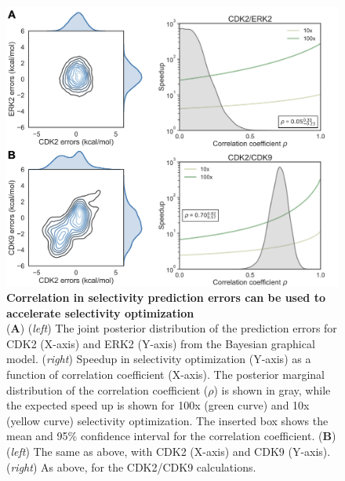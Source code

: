 \documentclass[phd,tocprelim]{cornell}
\begin{document}
\begin{landscape}
\begin{figure}
\centering
\includegraphics[width=0.7\linewidth]{figures/figure5.png}
\caption[Correlation in selectivity prediction errors can be used to accelerate selectivity optimization]{
{\bf Correlation in selectivity prediction errors can be used to accelerate selectivity optimization} \\
({\bf A}) (\emph{left}) The joint posterior distribution of the prediction errors for CDK2 (X-axis) and ERK2 (Y-axis) from the Bayesian graphical model. (\emph{right}) Speedup in selectivity optimization (Y-axis) as a function of correlation coefficient (X-axis). The posterior marginal distribution of the correlation coefficient ($\rho$) is shown in gray, while the expected speed up is shown for 100x (green curve) and 10x (yellow curve) selectivity optimization. The inserted box shows the mean and 95\% confidence interval for the correlation coefficient. 
({\bf B}) (\emph{left}) The same as above, with CDK2 (X-axis) and CDK9 (Y-axis). (\emph{right}) As above, for the CDK2/CDK9 calculations.
}
\label{fig:figure-5}
\end{figure}
\end{landscape}
\end{document}
